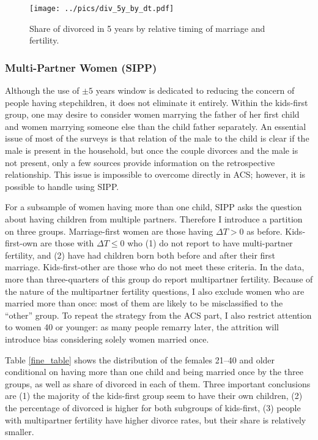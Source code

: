 \documentclass[12pt,letter]{article}
\begin{document}
\begin{figure}[h!]
\begin{center}
\texttt{[image: ../pics/div\_5y\_by\_dt.pdf]}
\caption{Share of divorced in 5 years by relative timing of marriage and fertility.\label{fig2}}
\end{center}
\end{figure}




\subsubsection{Multi-Partner Women (SIPP)}
Although the use of $\pm 5$ years window is dedicated to reducing the concern of people having stepchildren, it does not eliminate it entirely. Within the kids-first group, one may desire to consider women marrying the father of her first child and women marrying someone else than the child father separately. An essential issue of most of the surveys is that relation of the male to the child is clear if the male is present in the household, but once the couple divorces and the male is not present, only a few sources provide information on the retrospective relationship. This issue is impossible to overcome directly in ACS; however, it is possible to handle using SIPP.

For a subsample of women having more than one child, SIPP asks the question about having children from multiple partners. Therefore I introduce a partition on three groups. Marriage-first women are those having $\Delta T > 0$ as before. Kids-first-own are those with $\Delta T \leq 0$ who (1) do not report to have multi-partner fertility, and (2) have had children born both before and after their first marriage. Kids-first-other are those who do not meet these criteria. In the data, more than three-quarters of this group do report multipartner fertility. Because of the nature of the multipartner fertility questions, I also exclude women who are married more than once: most of them are likely to be misclassified to the ``other'' group. To repeat the strategy from the ACS part, I also restrict attention to women 40 or younger: as many people remarry later, the attrition will introduce bias considering solely women married once.

Table \ref{fine_table} shows the distribution of the females 21--40 and older conditional on having more than one child and being married once by the three groups, as well as share of divorced in each of them. Three important conclusions are (1) the majority of the kids-first group seem to have their own children, (2) the percentage of divorced is higher for both subgroups of kids-first, (3) people with multipartner fertility have higher divorce rates, but their share is relatively smaller.
\end{document}
